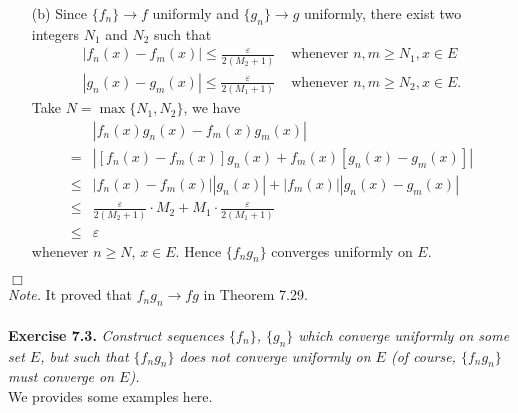 \documentclass{article}
\begin{document}
\begin{enumerate}
\begin{enumerate}
    \item[(b)]
    Since $\{f_n\} \to f$ uniformly and $\{g_n\} \to g$ uniformly,
    there exist two integers $N_1$ and $N_2$ such that
    \begin{align*}
      |f_n(x) - f_m(x)| \leq \frac{\varepsilon}{2(M_2 + 1)}
      &\text{ whenever }
      n,m \geq N_1, x \in E \\
      |g_n(x) - g_m(x)| \leq \frac{\varepsilon}{2(M_1 + 1)}
      &\text{ whenever }
      n,m \geq N_2, x \in E.
    \end{align*}
    Take $N = \max\{N_1,N_2\}$, we have
    \begin{align*}
      &|f_n(x)g_n(x) - f_m(x)g_m(x)| \\
      =& |[f_n(x) - f_m(x)]g_n(x) + f_m(x)[g_n(x) - g_m(x)]| \\
      \leq& |f_n(x) - f_m(x)||g_n(x)| + |f_m(x)||g_n(x) - g_m(x)| \\
      \leq& \frac{\varepsilon}{2(M_2 + 1)} \cdot M_2
        + M_1 \cdot \frac{\varepsilon}{2(M_1 + 1)} \\
      \leq& \varepsilon
    \end{align*}
    whenever $n \geq N$, $x \in E$.
    Hence $\{f_n g_n\}$ converges uniformly on $E$.
  \end{enumerate}
\end{enumerate}
$\Box$ \\

\emph{Note.} It proved that $f_n g_n \to fg$ in Theorem 7.29.
\\\\






\textbf{Exercise 7.3.}
\emph{Construct sequences $\{f_n\}$, $\{g_n\}$ which converge uniformly on some set $E$,
but such that $\{f_n g_n\}$ does not converge uniformly on $E$
(of course, $\{f_n g_n\}$ must converge on $E$).} \\

We provides some examples here. \\
\end{document}
